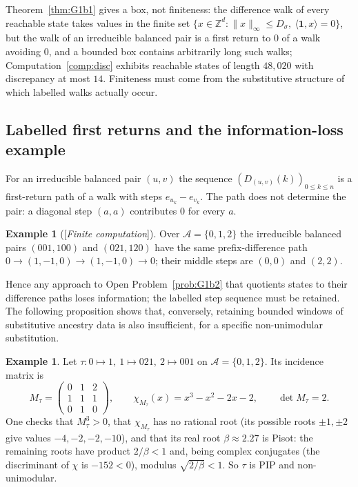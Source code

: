 \documentclass[11pt]{amsart}
\theoremstyle{plain}
\theoremstyle{definition}
\newtheorem{example}[theorem]{Example}
\theoremstyle{remark}
\newcommand{\Z}{\mathbb{Z}}
\newcommand{\A}{\mathcal{A}}
\newcommand{\Status}[1]{\textup{[\textit{#1}]}}
\begin{document}
Theorem~\ref{thm:G1b1} gives a box, not finiteness: the difference walk of every reachable state takes values in the finite set $\{x\in\Z^d:\|x\|_\infty\le D_\sigma,\ \langle\mathbf 1,x\rangle=0\}$, but the walk of an irreducible balanced pair is a first return to $0$ of a walk avoiding $0$, and a bounded box contains arbitrarily long such walks; Computation~\ref{comp:disc} exhibits reachable states of length $48{,}020$ with discrepancy at most $14$. Finiteness must come from the substitutive structure of which labelled walks actually occur.

\subsection{Labelled first returns and the information-loss example}\label{sec:labelled}

For an irreducible balanced pair $(u,v)$ the sequence $(D_{(u,v)}(k))_{0\le k\le n}$ is a first-return path of a walk with steps $e_{u_k}-e_{v_k}$. The path does not determine the pair: a diagonal step $(a,a)$ contributes $0$ for every $a$.

\begin{example}[\Status{Finite computation}]\label{ex:collision}
Over $\A=\{0,1,2\}$ the irreducible balanced pairs $(001,100)$ and $(021,120)$ have the same prefix-difference path $0\to(1,-1,0)\to(1,-1,0)\to0$; their middle steps are $(0,0)$ and $(2,2)$.
\end{example}

Hence any approach to Open Problem~\ref{prob:G1b2} that quotients states to their difference paths loses information; the labelled step sequence must be retained. The following proposition shows that, conversely, retaining bounded windows of substitutive ancestry data is also insufficient, for a specific non-unimodular substitution.

\begin{example}\label{ex:tau}
Let $\tau:0\mapsto1,\ 1\mapsto021,\ 2\mapsto001$ on $\A=\{0,1,2\}$. Its incidence matrix is
\[
M_\tau=\begin{pmatrix}0&1&2\\1&1&1\\0&1&0\end{pmatrix},\qquad \chi_{M_\tau}(x)=x^3-x^2-2x-2,\qquad \det M_\tau=2 .
\]
One checks that $M_\tau^3>0$, that $\chi_{M_\tau}$ has no rational root (its possible roots $\pm1,\pm2$ give values $-4,-2,-2,-10$), and that its real root $\beta\approx2.27$ is Pisot: the remaining roots have product $2/\beta<1$ and, being complex conjugates (the discriminant of $\chi$ is $-152<0$), modulus $\sqrt{2/\beta}<1$. So $\tau$ is PIP and non-unimodular.
\end{example}
\end{document}
